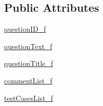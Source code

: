 \subsection*{Public Attributes}
\begin{DoxyCompactItemize}
\item 
\hyperlink{class_ecodena_1_1_question_1_1models_1_1_question_a82d6ae1631802a2652e2c5ddb91a4ea7}{questionID\_\-f}
\item 
\hyperlink{class_ecodena_1_1_question_1_1models_1_1_question_afbbad3df2af71e795a4397ae19f1433d}{questionText\_\-f}
\item 
\hyperlink{class_ecodena_1_1_question_1_1models_1_1_question_acece4b7c3af5411b6521468bfd308a38}{questionTitle\_\-f}
\item 
\hyperlink{class_ecodena_1_1_question_1_1models_1_1_question_a4bd58a5bfd741f2442344987976725b2}{commentList\_\-f}
\item 
\hyperlink{class_ecodena_1_1_question_1_1models_1_1_question_af2ca53119fdb8e495aa8d427287dcdb2}{testCasesList\_\-f}
\end{DoxyCompactItemize}
